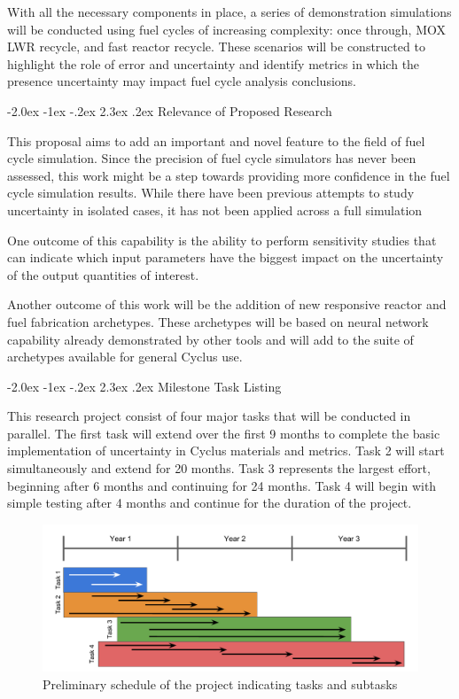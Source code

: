 \documentclass[dvips,11pt]{article}
\makeatletter
\renewcommand\section{\@startsection {section}{1}{\z@}%
                                   {-2.0ex \@plus -1ex \@minus -.2ex}%
                                   {2.3ex \@plus.2ex}%
                                   {\normalfont\bfseries}}%
\makeatother
\begin{document}
With all the necessary components in place, a
series of demonstration simulations will be
conducted using fuel cycles of increasing
complexity: once through, MOX LWR recycle, and
fast reactor recycle.  These scenarios will be
constructed to highlight the role of error and
uncertainty and identify metrics in which the
presence uncertainty may impact fuel cycle
analysis conclusions.

\section{Relevance of Proposed Research}

This proposal aims to add an important and novel
feature to the field of fuel cycle simulation.
Since the precision of fuel cycle simulators has
never been assessed, this work might be a step
towards providing more confidence in the fuel
cycle simulation results.  While there have been
previous attempts to study uncertainty in isolated
cases\cite{visionEcon}, it has not been applied
across a full simulation

One outcome of this capability is the ability to
perform sensitivity studies that can indicate
which input parameters have the biggest impact on
the uncertainty of the output quantities of
interest.

Another outcome of this work will be the addition
of new responsive reactor and fuel fabrication
archetypes.  These archetypes will be based on
neural network capability already demonstrated by
other tools and will add to the suite of
archetypes available for general Cyclus use.

\section{Milestone Task Listing}

This research project consist of four major tasks
that will be conducted in parallel.  The first
task will extend over the first 9 months to
complete the basic implementation of uncertainty
in Cyclus materials and metrics.  Task 2 will
start simultaneously and extend for 20 months.
Task 3 represents the largest effort, beginning
after 6 months and continuing for 24 months.  Task
4 will begin with simple testing after 4 months
and continue for the duration of the project.

\begin{figure}[h!]
\centering
\includegraphics[width=\textwidth]	{timeline}
\caption{Preliminary schedule of the project indicating tasks and subtasks}
\label{fig:progression}
\end{figure}
\end{document}
